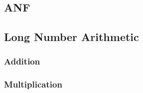 \documentclass[11pt, a4paper]{article}
\begin{document}
\subsection{ANF}\label{subsec:anf}

\subsection{Long Number Arithmetic}\label{subsec:longnumberarithmetic}

\subsubsection{Addition}\label{subsubsec:addition}

\subsubsection{Multiplication}\label{subsubsec:multiplication}
\end{document}
